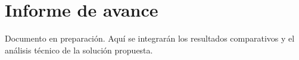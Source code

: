 \documentclass[11pt,a4paper]{article}
\begin{document}
\section*{Informe de avance}
Documento en preparación. Aquí se integrarán los resultados comparativos y el análisis técnico de la solución propuesta.
\end{document}
